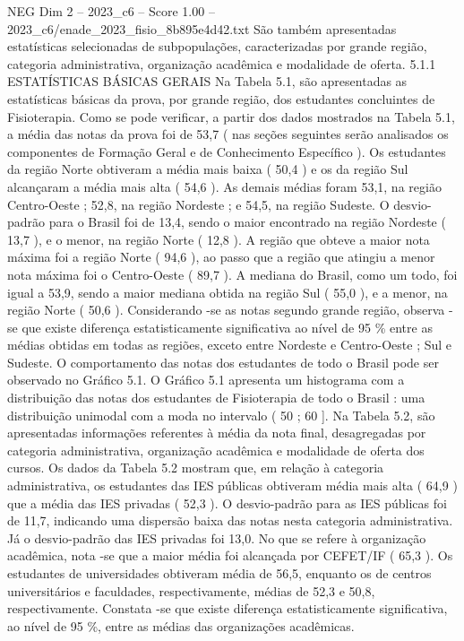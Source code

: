 \begin{textsample}{NEG Dim 2 – 2023\_c6 – Score 1.00 – 2023\_c6/enade\_2023\_fisio\_8b895e4d42.txt}
São também apresentadas estatísticas selecionadas de subpopulações, caracterizadas por grande região, categoria administrativa, organização acadêmica e modalidade de oferta. 5.1.1 ESTATÍSTICAS BÁSICAS GERAIS Na Tabela 5.1, são apresentadas as estatísticas básicas da prova, por grande região, dos estudantes concluintes de Fisioterapia.
Como se pode verificar, a partir dos dados mostrados na Tabela 5.1, a média das notas da prova foi de 53,7 ( nas seções seguintes serão analisados os componentes de Formação Geral e de Conhecimento Específico ).
Os estudantes da região Norte obtiveram a média mais baixa ( 50,4 ) e os da região Sul alcançaram a média mais alta ( 54,6 ).
As demais médias foram 53,1, na região Centro-Oeste ; 52,8, na região Nordeste ; e 54,5, na região Sudeste.
O desvio-padrão para o Brasil foi de 13,4, sendo o maior encontrado na região Nordeste ( 13,7 ), e o menor, na região Norte ( 12,8 ).
A região que obteve a maior nota máxima foi a região Norte ( 94,6 ), ao passo que a região que atingiu a menor nota máxima foi o Centro-Oeste ( 89,7 ).
A mediana do Brasil, como um todo, foi igual a 53,9, sendo a maior mediana obtida na região Sul ( 55,0 ), e a menor, na região Norte ( 50,6 ).
Considerando -se as notas segundo grande região, observa -se que existe diferença estatisticamente significativa ao nível de 95 \% entre as médias obtidas em todas as regiões, exceto entre Nordeste e Centro-Oeste ; Sul e Sudeste.
O comportamento das notas dos estudantes de todo o Brasil pode ser observado no Gráfico 5.1.
O Gráfico 5.1 apresenta um histograma com a distribuição das notas dos estudantes de Fisioterapia de todo o Brasil : uma distribuição unimodal com a moda no intervalo ( 50 ; 60 ].
Na Tabela 5.2, são apresentadas informações referentes à média da nota final, desagregadas por categoria administrativa, organização acadêmica e modalidade de oferta dos cursos.
Os dados da Tabela 5.2 mostram que, em relação à categoria administrativa, os estudantes das IES públicas obtiveram média mais alta ( 64,9 ) que a média das IES privadas ( 52,3 ).
O desvio-padrão para as IES públicas foi de 11,7, indicando uma dispersão baixa das notas nesta categoria administrativa.
Já o desvio-padrão das IES privadas foi 13,0.
No que se refere à organização acadêmica, nota -se que a maior média foi alcançada por CEFET/IF ( 65,3 ).
Os estudantes de universidades obtiveram média de 56,5, enquanto os de centros universitários e faculdades, respectivamente, médias de 52,3 e 50,8, respectivamente.
Constata -se que existe diferença estatisticamente significativa, ao nível de 95 \%, entre as médias das organizações acadêmicas.

\end{textsample}
